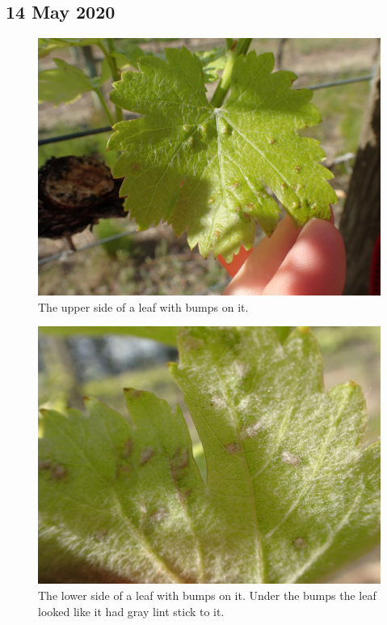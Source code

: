 \documentclass[11pt,letter]{article}
\begin{document}
\subsection{14 May 2020}
\begin{figure}%
  \includegraphics[width=\linewidth]{UpperLumpsFaith.jpg}
  \caption{The upper side of a leaf with bumps on it. }
  \label{fig:upperlumpsFaith}
\end{figure}
\begin{figure}%
  \includegraphics[width=\linewidth]{LowerLumpsFaith.jpg}
  \caption{The lower side of a leaf with bumps on it. Under the bumps the leaf looked like it had gray lint stick to it. }
  \label{fig:lowerLunpsFaith}
\end{figure} 
\end{document}
